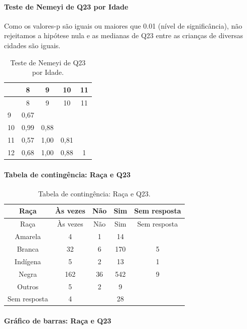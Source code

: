 \documentclass[]{article}
\let\oldparagraph\paragraph
\renewcommand{\paragraph}[1]{\oldparagraph{#1}\mbox{}}
\begin{document}
\hypertarget{teste-de-nemeyi-de-q23-por-idade}{%
\paragraph{Teste de Nemeyi de Q23 por Idade}\label{teste-de-nemeyi-de-q23-por-idade}}

Como os valores-p são iguais ou maiores que 0.01 (nível de significância), não rejeitamos a hipótese nula e as medianas de Q23 entre as crianças de diversas cidades são iguais.

\begin{longtable}[]{@{}lcccc@{}}
\caption{\label{tab:unnamed-chunk-572}Teste de Nemeyi de Q23 por Idade.}\tabularnewline
\toprule
& 8 & 9 & 10 & 11\tabularnewline
\midrule
\endfirsthead
\toprule
& 8 & 9 & 10 & 11\tabularnewline
\midrule
\endhead
9 & 0,67 & & &\tabularnewline
10 & 0,99 & 0,88 & &\tabularnewline
11 & 0,57 & 1,00 & 0,81 &\tabularnewline
12 & 0,68 & 1,00 & 0,88 & 1\tabularnewline
\bottomrule
\end{longtable}

\cleardoublepage

\hypertarget{tabela-de-continguxeancia-rauxe7a-e-q23}{%
\paragraph{Tabela de contingência: Raça e Q23}\label{tabela-de-continguxeancia-rauxe7a-e-q23}}

\begin{longtable}[]{@{}ccccc@{}}
\caption{\label{tab:unnamed-chunk-573}Tabela de contingência: Raça e Q23.}\tabularnewline
\toprule
Raça & Às vezes & Não & Sim & Sem resposta\tabularnewline
\midrule
\endfirsthead
\toprule
Raça & Às vezes & Não & Sim & Sem resposta\tabularnewline
\midrule
\endhead
Amarela & 4 & 1 & 14 &\tabularnewline
Branca & 32 & 6 & 170 & 5\tabularnewline
Indígena & 5 & 2 & 13 & 1\tabularnewline
Negra & 162 & 36 & 542 & 9\tabularnewline
Outros & 5 & 2 & 9 &\tabularnewline
Sem resposta & 4 & & 28 &\tabularnewline
\bottomrule
\end{longtable}

\hypertarget{gruxe1fico-de-barras-rauxe7a-e-q23}{%
\paragraph{Gráfico de barras: Raça e Q23}\label{gruxe1fico-de-barras-rauxe7a-e-q23}}
\end{document}

